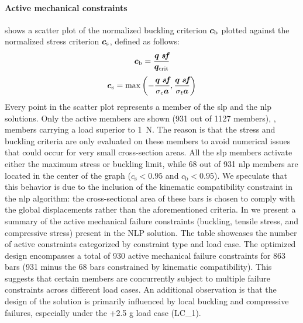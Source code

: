 \paragraph{Active mechanical constraints} \label{sec:07_amc}
 shows a scatter plot of the normalized buckling criterion $\bm{c}_\text{b}$ plotted against the normalized stress criterion $\bm{c}_\text{s}$, defined as follows:
\begin{equation}
    \bm{c}_\text{b}=\frac{\bm{q}\; \textit{\textbf{sf}}}{\bm{q}_{\text{crit}}}
\end{equation}
\begin{equation}
    \bm{c}_\text{s}=\max{\left(-\frac{\bm{q} \; \textit{\textbf{sf}}}{\sigma_c \bm{a}},\frac{\bm{q} \; \textit{\textbf{sf}}}{\sigma_t \bm{a}}\right)}
\end{equation}
Every point in the scatter plot represents a member of the \gls{slp} and the \gls{nlp} solutions. Only the active members are shown (931 out of 1127 members), \ie, members carrying a load superior to \qty{1}{N}. The reason is that the stress and buckling criteria are only evaluated on these members to avoid numerical issues that could occur for very small cross-section areas. All the \gls{slp} members activate either the maximum stress or buckling limit, while 68 out of 931 \gls{nlp} members are located in the center of the graph ($c_\text{s}<0.95$ and $c_\text{b}<0.95$). We speculate that this behavior is due to the inclusion of the kinematic compatibility constraint in the \gls{nlp} algorithm: the cross-sectional area of these bars is chosen to comply with the global displacements rather than the aforementioned criteria. In  we present a summary of the active mechanical failure constraints (buckling, tensile stress, and compressive stress) present in the NLP solution. The table showcases the number of active constraints categorized by constraint type and load case. The optimized design encompasses a total of 930 active mechanical failure constraints for 863 bars (931 minus the 68 bars constrained by kinematic compatibility). This suggests that certain members are concurrently subject to multiple failure constraints across different load cases. An additional observation is that the design of the solution is primarily influenced by local buckling and compressive failures, especially under the +2.5 g load case (LC\_1).

